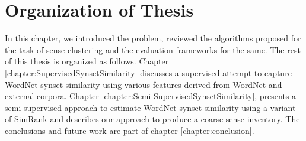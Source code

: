 \begin{comment}
\subsection{Understanding sense clustering}
When we merge two synsets, should we modify the underlying structure of taxonomy as well?
What should be the repercussion of the mergings on the taxonomy?

An important point to note here is that if we merge two synsets and introduce the merged synsets instead of the original synsets in the WordNet taxonomy, either we'll be adding some spurious relations and/or we'll be losing some relationship information.

\end{comment}

\section{Organization of Thesis}
In this chapter, we introduced the problem, reviewed the algorithms proposed for the task of sense clustering and the evaluation frameworks for the same. 
The rest of this thesis is organized as follows. 
Chapter \ref{chapter:SupervisedSynsetSimilarity} discusses a supervised attempt to capture WordNet synset similarity using various features derived from WordNet and external corpora. 
Chapter \ref{chapter:Semi-SupervisedSynsetSimilarity}, presents a semi-supervised approach to estimate WordNet synset similarity using a variant of SimRank \citep{Jeh02simrank} and describes our approach to produce a coarse sense inventory. 
The conclusions and future work are part of chapter \ref{chapter:conclusion}.
